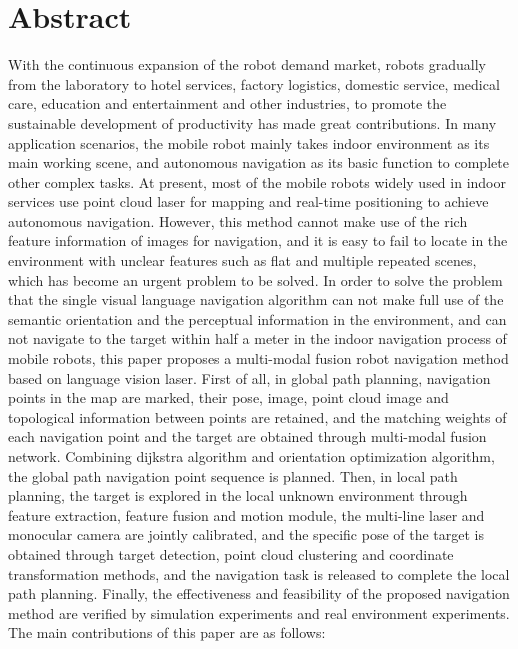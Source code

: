 
\chapter{Abstract}
    With the continuous expansion of the robot demand market, robots gradually from the laboratory to hotel services, factory logistics, domestic service, medical care, education and entertainment and other industries, to promote the sustainable development of productivity has made great contributions. In many application scenarios, the mobile robot mainly takes indoor environment as its main working scene, and autonomous navigation as its basic function to complete other complex tasks. At present, most of the mobile robots widely used in indoor services use point cloud laser for mapping and real-time positioning to achieve autonomous navigation. However, this method cannot make use of the rich feature information of images for navigation, and it is easy to fail to locate in the environment with unclear features such as flat and multiple repeated scenes, which has become an urgent problem to be solved.
    In order to solve the problem that the single visual language navigation algorithm can not make full use of the semantic orientation and the perceptual information in the environment, and can not navigate to the target within half a meter in the indoor navigation process of mobile robots, this paper proposes a multi-modal fusion robot navigation method based on language vision laser. First of all, in global path planning, navigation points in the map are marked, their pose, image, point cloud image and topological information between points are retained, and the matching weights of each navigation point and the target are obtained through multi-modal fusion network. Combining dijkstra algorithm and orientation optimization algorithm, the global path navigation point sequence is planned. Then, in local path planning, the target is explored in the local unknown environment through feature extraction, feature fusion and motion module, the multi-line laser and monocular camera are jointly calibrated, and the specific pose of the target is obtained through target detection, point cloud clustering and coordinate transformation methods, and the navigation task is released to complete the local path planning. Finally, the effectiveness and feasibility of the proposed navigation method are verified by simulation experiments and real environment experiments.
    The main contributions of this paper are as follows:

